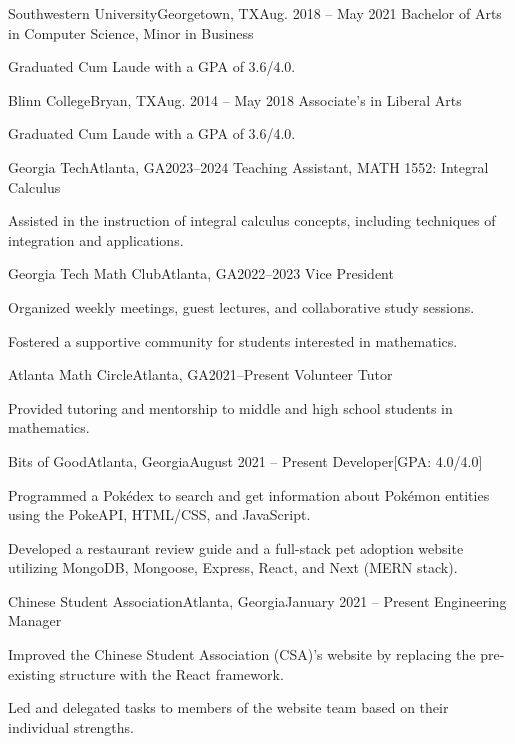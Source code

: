 \begin{resume-itemize}
  {Southwestern University}{Georgetown, TX}{Aug. 2018 -- May 2021}
  {Bachelor of Arts in Computer Science, Minor in Business}
  \item Graduated Cum Laude with a GPA of 3.6/4.0.
\end{resume-itemize}
\begin{resume-itemize}
  {Blinn College}{Bryan, TX}{Aug. 2014 -- May 2018}
  {Associate's in Liberal Arts}
  \item Graduated Cum Laude with a GPA of 3.6/4.0.
\end{resume-itemize}


\begin{resume-itemize}
  {Georgia Tech}{Atlanta, GA}{2023--2024}
  {Teaching Assistant, MATH 1552: Integral Calculus}
  \item Assisted in the instruction of integral calculus concepts, including techniques of integration and applications.
\end{resume-itemize}
\begin{resume-itemize}
  {Georgia Tech Math Club}{Atlanta, GA}{2022--2023}
  {Vice President}
  \item Organized weekly meetings, guest lectures, and collaborative study sessions.
  \item Fostered a supportive community for students interested in mathematics.
\end{resume-itemize}
\begin{resume-itemize}
  {Atlanta Math Circle}{Atlanta, GA}{2021--Present}
  {Volunteer Tutor}
  \item Provided tutoring and mentorship to middle and high school students in mathematics.
\end{resume-itemize}
\begin{resume-itemize}
  {Bits of Good}{Atlanta, Georgia}{August 2021 -- Present}
  {Developer}[GPA: 4.0/4.0]
    \item Programmed a Pokédex to search and get information about Pokémon entities using the PokeAPI, HTML/CSS, and JavaScript.
    \item Developed a restaurant review guide and a full-stack pet adoption website utilizing MongoDB, Mongoose, Express, React, and Next (MERN stack).
\end{resume-itemize}
\begin{resume-itemize}
  {Chinese Student Association}{Atlanta, Georgia}{January 2021 -- Present}
  {Engineering Manager}
  \item Improved the Chinese Student Association (CSA)'s website by replacing the pre-existing structure with the React framework.
  \item Led and delegated tasks to members of the website team based on their individual strengths.
\end{resume-itemize}
